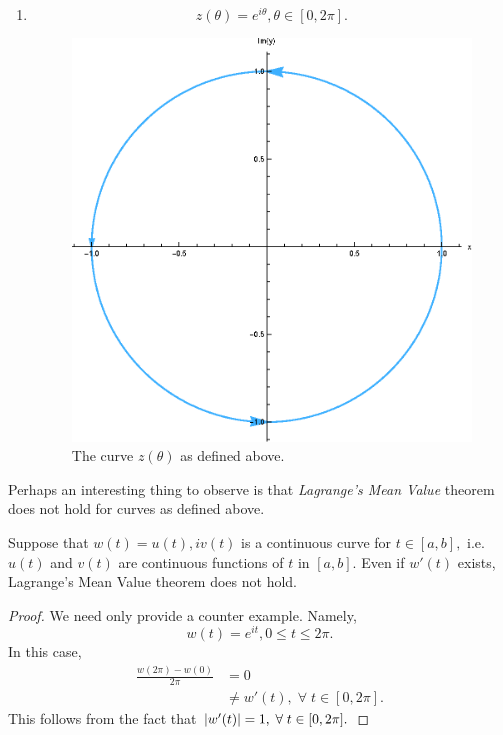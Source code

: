 \documentclass[12pt]{book}
\begin{document}
\begin{enumerate}[label = {(\roman*)}]
        \item
        \[
            z(\theta) = e^{i\theta}, \theta \in [0, 2\pi].
        \]
        \begin{figure}[H]
            \centering
            \includegraphics[scale = 0.7]{./figs/chapter_2/curve_ex_2.eps}
            \caption{The curve $z(\theta)$ as defined above.}
        \end{figure}
\end{enumerate}
Perhaps an interesting thing to observe is that \textit{Lagrange's Mean Value} theorem does not hold for curves as defined above.
\begin{thm}
    Suppose that $w(t) = u(t), iv(t)$ is a continuous curve for $t \in [a, b],$ i.e. $u(t)$ and $v(t)$ are continuous functions of $t$ in $[a, b]$. Even if $w'(t)$ exists, Lagrange's Mean Value theorem does not hold.
\end{thm}
\begin{proof}
    We need only provide a counter example. Namely,
    \[
        w(t) = e^{it}, 0 \leq t \leq 2\pi.
    \]
    In this case,
    \begin{align*}
        \frac{w(2\pi) - w(0)}{2\pi}
            &=
                0 \\
            &\neq
                w'(t), \;\forall\; t \in [0, 2\pi].
    \end{align*}
    This follows from the fact that $\left\lvert w'(t) \right\rvert = 1, \;\forall\; t \in [0, 2\pi].$
\end{proof}
\end{document}
